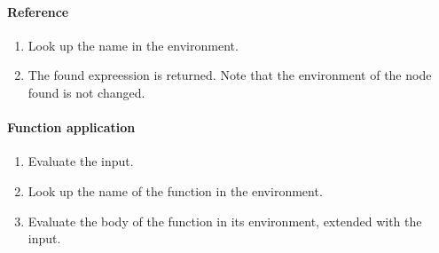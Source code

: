 \documentclass[a4paper,12pt]{article}
\begin{document}
\paragraph{Reference}
\begin{enumerate}
\item Look up the name in the environment.
\item The found expreession is returned. Note that the environment of the node found is not changed.
\end{enumerate}

\paragraph{Function application}
\begin{enumerate}
\item Evaluate the input.
\item Look up the name of the function in the environment.
\item Evaluate the body of the function in its environment, extended with the input.
\end{enumerate}
\end{document}
